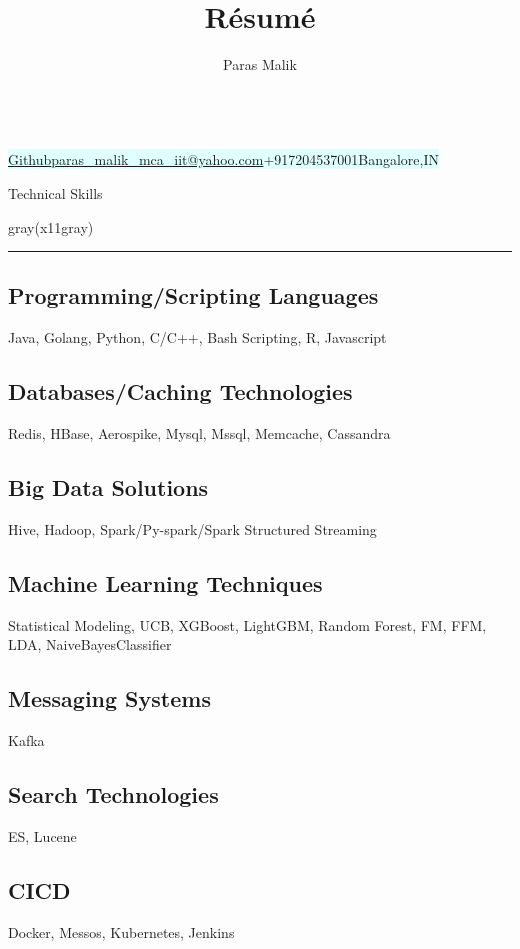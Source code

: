 \documentclass[10.5pt,a4paper]{article}
\makeatletter
\renewcommand{\maketitle}{
\begin{center}
{\Huge \bfseries
\theauthor} \vspace{.25em} \\
\colorbox{lightcyan}{
\href{http://github.com/i-plusplus}{Github}{\textbar}\href{mailto:paras\_malik\_mca\_iit@yahoo.com}{paras\_malik\_mca\_iit@yahoo.com}{\textbar}+917204537001{\textbar}Bangalore,IN
} 
\vspace{.5em}
\vspace{2em}
\end{center}
}
\makeatother
\begin{document}
\title{R\'esum\'e}
\author{Paras Malik}
\maketitle
\begin{multicols}{2}
\setlength{\columnseprule}{0.4pt}
\begin{section}{Technical Skills}
\end{section}
\begin{color}{gray(x11gray)}\hrule\end{color}
\vspace{5mm}
\subsection{Programming/Scripting Languages}
Java, Golang, Python, C/C++, Bash Scripting, R, Javascript
\subsection{Databases/Caching Technologies}
Redis, HBase, Aerospike, Mysql, Mssql, Memcache, Cassandra
\subsection{Big Data Solutions}
Hive, Hadoop, Spark/Py-spark/Spark Structured Streaming
\subsection{Machine Learning Techniques}
Statistical Modeling, UCB, XGBoost, LightGBM, Random Forest, FM, FFM, LDA, NaiveBayesClassifier
\subsection{Messaging Systems}
Kafka
\subsection{Search Technologies}
ES, Lucene
\subsection{CICD}
Docker, Messos, Kubernetes, Jenkins

\end{multicols}
\end{document}
